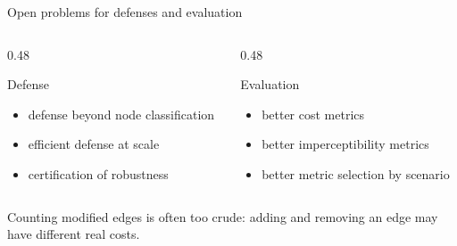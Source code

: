 \begin{frame}{Open problems for defenses and evaluation}
  \begin{columns}[T,onlytextwidth]
    \begin{column}{0.48\textwidth}
      \begin{exampleblock}{Defense}
        \begin{itemize}
          \item defense beyond node classification
          \item efficient defense at scale
          \item certification of robustness
        \end{itemize}
      \end{exampleblock}
    \end{column}
    \begin{column}{0.48\textwidth}
      \begin{block}{Evaluation}
        \begin{itemize}
          \item better cost metrics
          \item better imperceptibility metrics
          \item better metric selection by scenario
        \end{itemize}
      \end{block}
    \end{column}
  \end{columns}
  \vspace{0.35em}
  {\small\color{PresThreeMuted}Counting modified edges is often too crude: adding and removing an edge may have different real costs.}
\end{frame}

